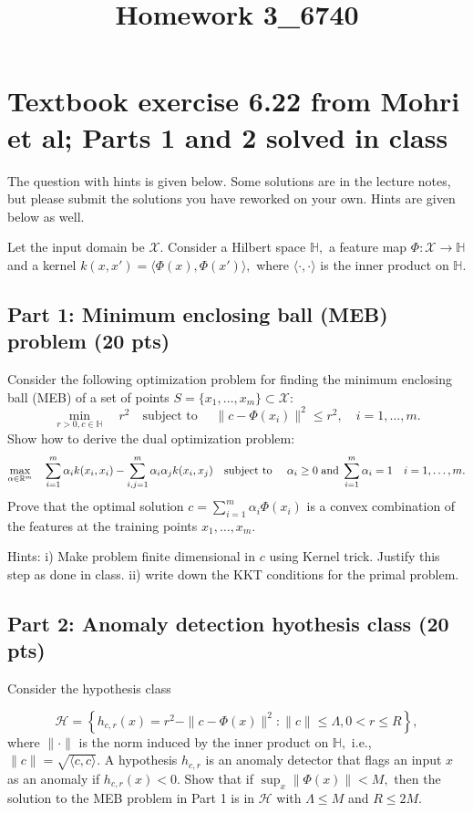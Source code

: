 \documentclass[12pt]{article}
\title{Homework 3_6740}
\begin{document}
\MakeScribeTop


\section*{Textbook exercise 6.22 from Mohri et al;  Parts 1 and 2 solved in class}

The question with hints is given below. Some solutions are in the lecture notes, but please submit the solutions you have reworked on your own. Hints are given below as well.

Let the input domain be $\mathcal{X}$.
Consider a Hilbert space $\mathbb{H},$ a feature map $\Phi:\mathcal{X}\to\mathbb{H}$ and a kernel $k(x,x') = \langle \Phi(x), \Phi(x')\rangle,$ where $\langle \cdot, \cdot\rangle$ is the inner product on $\mathbb{H}.$
\subsection*{Part 1: Minimum enclosing ball (MEB) problem (20 pts)}

Consider the following optimization problem for finding the minimum enclosing ball (MEB) of a set of points $S = \{x_1,\ldots,x_m\}\subset\mathcal{X}$:
\begin{equation}
\min_{r>0,c\in\mathbb{H}} \quad r^2 \quad \text{subject to } \quad \|c-\Phi(x_i)\|^2\leq r^2, \quad i=1,\ldots,m.
\end{equation}
Show how to derive the dual optimization problem:
\begin{equation}
	\max_{\alpha\in\mathbb{R}^m} \quad \sum_{i=1}^m \alpha_i k(x_i, x_i) - \sum_{i,j=1}^m \alpha_i\alpha_j k(x_i,x_j) \quad \text{subject to } \quad \alpha_i \geq 0 \;{\rm and}\; \sum_{i=1}^m \alpha_i = 1\quad i=1,\ldots,m.
\end{equation}
Prove that the optimal solution $c = \sum_{i=1}^m \alpha_i \Phi(x_i)$ is a convex combination of the features at the training points $x_1,\ldots,x_m.$ 

Hints: i) Make problem finite dimensional in $c$ using Kernel trick. Justify this step as done in class. ii) write down the KKT conditions for the primal problem. 


\subsection*{Part 2: Anomaly detection hyothesis class (20 pts)}

Consider the hypothesis class 

\begin{equation}
	\mathcal{H} = \left\{h_{c,r}(x) = r^2 - \|c-\Phi(x)\|^2:\|c\|\leq \Lambda, 0 < r \leq R\right\},
\end{equation}
where $\|\cdot\|$ is the norm induced by the inner product on $\mathbb{H},$ i.e., $\|c\| = \sqrt{\langle c,c\rangle}.$ A hypothesis $h_{c,r}$ is an anomaly detector that flags an input $x$ as an anomaly if $h_{c,r}(x) < 0.$
Show that if $\sup_x \|\Phi(x)\| < M,$ then the solution to the MEB problem in Part 1 is in $\mathcal{H}$ with $\Lambda \leq M$ and $R \leq 2M.$
\end{document}
